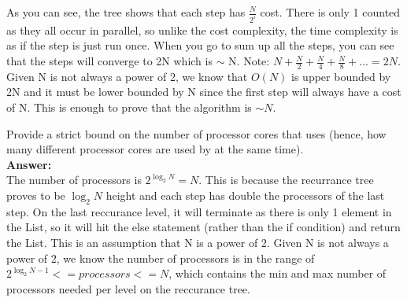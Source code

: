 \begin{problem}
\begin{questions}
As you can see, the tree shows that each step has $\frac{N}{2^i}$ cost. There is only 1 counted as they all occur in parallel, so unlike the cost complexity, the time complexity is as if the step is just run once. When you go to sum up all the steps, you can see that the steps will converge to 2N which is $\sim$ N. Note: $N + \frac{N}{2} + \frac{N}{4} + \frac{N}{8} +... = 2N$. Given N is not always a power of 2, we know that $O(N)$ is upper bounded by 2N and it must be lower bounded by N since the first step will always have a cost of N. This is enough to prove that the algorithm is $\sim N$.

\item Provide a strict bound on the number of processor cores that  uses (hence, how many different processor cores are used by  at the same time).\\
\textbf{Answer:}\\
The number of processors is $2^{\log_2 N} = N$. This is because the recurrance tree proves to be $\log_2N$ height and each step has double the processors of the last step. On the last reccurance level, it will terminate as there is only 1 element in the List, so it will hit the else statement (rather than the if condition) and return the List. This is an assumption that N is a power of 2. Given N is not always a power of 2, we know the number of processors is in the range of $2^{\log_2 N-1} <= processors <= N$, which contains the min and max number of processors needed per level on the reccurance tree.
\end{questions}
\end{problem}

